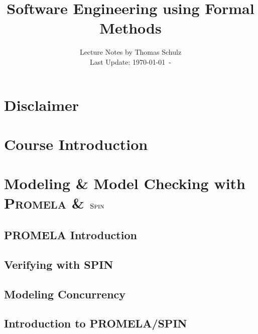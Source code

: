 \documentclass[12pt,accentcolor=tud1b,bibtotoc,colorback,linedtoc,liststotoc,bigchapter,noresetcounter]{tudreport}
\title{Software Engineering using Formal Methods}
\subtitle{Lecture Notes by Thomas Schulz\\
Last Update: \today \ - \thistime}
\begin{document}
 

\maketitle
\tableofcontents

\newpage



\chapter*{Disclaimer}

\newpage

\chapter*{Course Introduction}

\newpage



\chapter{Modeling \& Model Checking with \textsc{Promela} \& $\textsc{Spin}$}


\section{PROMELA Introduction}

\newpage

\section{Verifying with SPIN}

\newpage

\section{Modeling Concurrency}

\newpage

\section{Introduction to PROMELA/SPIN}

\newpage
\end{document}
